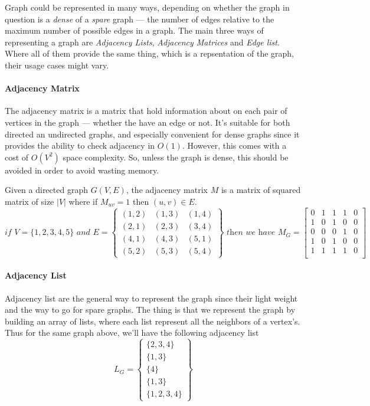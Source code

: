 \documentclass[12pt]{article}
\begin{document}
Graph could be represented in many ways, depending on whether the graph in question is a \textit{dense} of a \textit{spare} graph --- the number of edges relative to the maximum number of possible edges in a graph. The main three ways of representing a graph are \textit{Adjacency Lists}, \textit{Adjacency Matrices} and \textit{Edge list}. Where all of them provide the same thing, which is a repsentation of the graph, their usage cases might vary.

\paragraph{Adjacency Matrix}

The adjacency matrix is a matrix that hold information about on each pair of vertices in the graph --- whether the have an edge or not. It's suitable for both directed an undirected graphs, and especially convenient for dense graphs since it provides the ability to check adjacency in $O(1)$. However, this comes with a cost of $O(V^2)$ space complexity. So, unless the graph is dense, this should be avoided in order to avoid wasting memory.

Given a directed graph $G(V, E)$, the adjacency matrix $M$ is a matrix of squared matrix of size $|V|$ where if $M_{uv} = 1$ then $(u,v) \in E$. \[
  \textit{if } V=\{1,2,3,4,5\} \textit{ and } E=\left\{  \begin{matrix}
      (1,2) & (1,3) & (1,4) \\
      (2,1) & (2,3) & (3,4) \\
      (4,1) & (4,3) & (5,1) \\
      (5,2) & (5,3) & (5,4)
    \end{matrix}
  \right\}  \textit{ then we have }
  M_G =
  \begin{bmatrix}
    0 & 1 & 1 & 1 & 0 \\
    1 & 0 & 1 & 0 & 0 \\
    0 & 0 & 0 & 1 & 0 \\
    1 & 0 & 1 & 0 & 0 \\
    1 & 1 & 1 & 1 & 0 \\
  \end{bmatrix}
\]

\paragraph{Adjacency List}
Adjacency list are the general way to represent the graph since their light weight and the way to go for spare graphs. The thing is that we represent the graph by building an array of lists, where each list represent all the neighbors of a vertex's. Thus for the same graph above, we'll have the following adjacency list \[
  L_G = \left\{
    \begin{matrix}
      \{2,3,4\} \\
      \{1,3\} \\
      \{4\} \\
      \{1,3\} \\
      \{1,2,3,4\}
    \end{matrix}
  \right\}
\]
\end{document}
